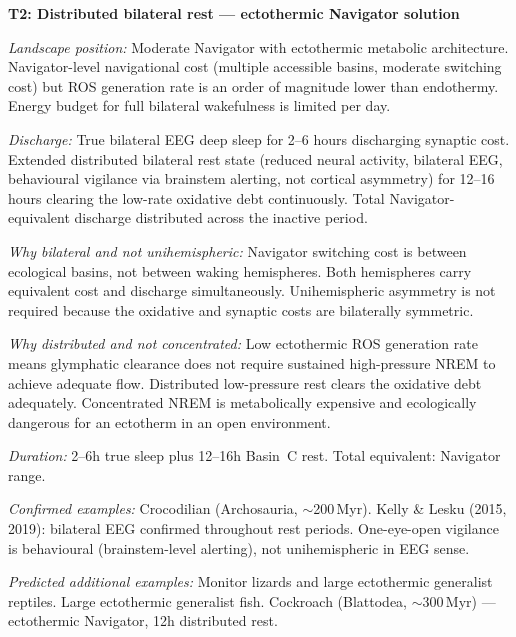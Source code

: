 \documentclass[10pt, a4paper]{article}
\begin{document}
\begin{mdframed}[
  backgroundcolor=topologybox,
  linecolor=headergreen,
  linewidth=0.8pt,
  innertopmargin=0.6em,
  innerbottommargin=0.6em,
  innerleftmargin=0.8em,
  innerrightmargin=0.8em
]
\textbf{T2: Distributed bilateral rest ---
ectothermic Navigator solution}

\textit{Landscape position:} Moderate
Navigator with ectothermic metabolic
architecture. Navigator-level navigational
cost (multiple accessible basins, moderate
switching cost) but ROS generation rate
is an order of magnitude lower than
endothermy. Energy budget for full
bilateral wakefulness is limited per day.

\textit{Discharge:} True bilateral EEG
deep sleep for 2--6 hours discharging
synaptic cost. Extended distributed
bilateral rest state (reduced neural
activity, bilateral EEG, behavioural
vigilance via brainstem alerting, not
cortical asymmetry) for 12--16 hours
clearing the low-rate oxidative debt
continuously. Total Navigator-equivalent
discharge distributed across the inactive
period.

\textit{Why bilateral and not
unihemispheric:} Navigator switching cost
is between ecological basins, not between
waking hemispheres. Both hemispheres carry
equivalent cost and discharge simultaneously.
Unihemispheric asymmetry is not required
because the oxidative and synaptic costs
are bilaterally symmetric.

\textit{Why distributed and not
concentrated:} Low ectothermic ROS
generation rate means glymphatic clearance
does not require sustained high-pressure
NREM to achieve adequate flow. Distributed
low-pressure rest clears the oxidative
debt adequately. Concentrated NREM is
metabolically expensive and ecologically
dangerous for an ectotherm in an
open environment.

\textit{Duration:} 2--6h true sleep plus
12--16h Basin~C rest. Total equivalent:
Navigator range.

\textit{Confirmed examples:} Crocodilian
(Archosauria, $\sim$200\,Myr). Kelly \&
Lesku (2015, 2019): bilateral EEG
confirmed throughout rest periods.
One-eye-open vigilance is behavioural
(brainstem-level alerting), not
unihemispheric in EEG sense.

\textit{Predicted additional examples:}
Monitor lizards and large ectothermic
generalist reptiles. Large ectothermic
generalist fish. Cockroach (Blattodea,
$\sim$300\,Myr) --- ectothermic Navigator,
12h distributed rest.
\end{mdframed}
\end{document}
